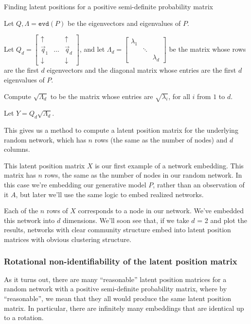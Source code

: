 \begin{algorithm}[h]\caption{Finding latent positions for a positive semi-definite probability matrix}
\label{alg:ch6:evd}
\SetAlgoLined
Let $Q, \Lambda = \texttt{evd}(P)$ be the eigenvectors and eigenvalues of $P$.

Let $Q_d = \begin{bmatrix}
    \uparrow & & \uparrow \\
    \vec q_1 & \hdots & \vec q_d \\
    \downarrow & & \downarrow
\end{bmatrix}$, and let $\Lambda_d = \begin{bmatrix}
    \lambda_1 & & \\
    & \ddots & \\
    & & \lambda_d
\end{bmatrix}$ be the matrix whose rows are the first $d$ eigenvectors and the diagonal matrix whose entries are the first $d$ eigenvalues of $P$.

Compute $\sqrt{\Lambda_d}$ to be the matrix whose entries are $\sqrt{\lambda_i}$, for all $i$ from $1$ to $d$.

Let $Y = Q_d \sqrt{\Lambda_d}$.

\end{algorithm}

This gives us a method to compute a latent position matrix for the underlying random network, which has $n$ rows (the same as the number of nodes) and $d$ columns. 

This latent position matrix $X$ is our first example of a network embedding. This matrix has $n$ rows, the same as the number of nodes in our random network. In this case we're embedding our generative model $P$, rather than an observation of it $A$, but later we'll use the same logic to embed realized networks.

Each of the $n$ rows of $X$ corresponds to a node in our network. We've embedded this network into $d$ dimensions. We'll soon see that, if we take $d$ = 2 and plot the results, networks with clear community structure embed into latent position matrices with obvious clustering structure.

\subsubsection*{Rotational non-identifiability of the latent position matrix}
\label{sec:ch6:spectral:nonidentifiable}
As it turns out, there are many ``reasonable'' latent position matrices for a random network with a positive semi-definite probability matrix, where by ``reasonable'', we mean that they all would produce the same latent position matrix. In particular, there are infinitely many embeddings that are identical up to a rotation.

